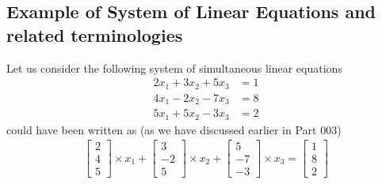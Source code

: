 \documentclass{article}
\begin{document}
\subsection{Example of System of Linear Equations and related terminologies}
Let us consider the following system of simultaneous linear equations
    \begin{align}
        2x_1 + 3x_2 + 5x_3 &= 1 \nonumber\\
        4x_1 - 2x_2 - 7x_3 &= 8 \nonumber\\
        5x_1 + 5x_2 - 3x_3 &= 2 \nonumber
    \end{align}
    could have been written as (as we have discussed earlier in Part 003)
    \begin{align}
        \begin{bmatrix}
            2\\
            4\\
            5
        \end{bmatrix} \times x_1 +\begin{bmatrix}
            3\\
            -2\\
            5
        \end{bmatrix} \times x_2+\begin{bmatrix}
            5\\
            -7\\
            -3
        \end{bmatrix} \times x_3 =\begin{bmatrix}
            1\\
            8\\
            2
        \end{bmatrix} \label{a1}
    \end{align}
\end{document}
